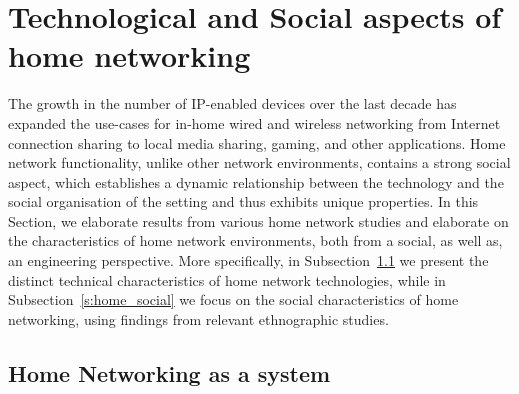 

\section{Technological and Social aspects of home networking} \label{s:elephant}

The growth in the number of IP-enabled devices over the last decade  has
expanded the use-cases for in-home wired and wireless networking from Internet
connection sharing to local media sharing, gaming, and other applications.  Home
network functionality, unlike other network environments, contains a strong
social aspect, which establishes a dynamic relationship between the technology
and the social organisation of the setting and thus exhibits unique properties.
In this Section, we elaborate results from various home network studies and
elaborate on the characteristics of home network environments, both from a
social, as well as, an engineering perspective.  More specifically, in
Subsection~\ref{s:home_measurement} we present the distinct technical
characteristics of home network technologies, while in
Subsection~\ref{s:home_social} we focus on the social characteristics of
home networking, using findings from relevant ethnographic studies. 



\subsection{Home Networking as a system} \label{s:home_measurement}

